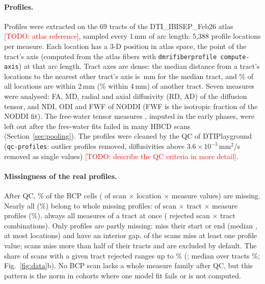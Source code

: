 \documentclass[11pt]{article}
\newcommand{\todo}[1]{\textcolor{red}{[TODO: #1]}}
\begin{document}
\paragraph{Profiles.} Profiles were extracted on the 69 tracts of the DTI\_IBISEP\_Feb26 atlas
\todo{atlas reference}, sampled every 1\,mm of arc length: 5,388 profile locations per measure. Each location has a
3-D position in atlas space, the point of the tract's axis (computed from the atlas fibers with
\texttt{dmrifiberprofile compute-axis}) at that arc length. Tract axes are dense: the median distance from a tract's
locations to the nearest other tract's axis is \axisTractMedian{}\,mm for the median tract, and \axisWithinTwo\% of all
locations are within 2\,mm (\axisWithinFour\% within 4\,mm) of another tract. Seven measures were analysed: FA, MD,
radial and axial diffusivity (RD, AD) of the diffusion tensor, and NDI, ODI and FWF of NODDI \citep{zhang2012noddi}
(FWF is the isotropic fraction of the NODDI fit). The free-water tensor measures
\citep{pasternak2009freewater}, imputed in the early phases, were left out after the free-water fits failed in many
HBCD scans (Section~\ref{sec:pooling}). The profiles were cleaned by the QC of DTIPlayground (\texttt{qc-profiles}:
outlier profiles removed, diffusivities above $3.6\times10^{-3}$\,mm$^2$/s removed as single values)
\todo{describe the QC criteria in more detail}.

\paragraph{Missingness of the real profiles.} After QC, \missCellShare\% of the BCP cells (\missCells{} of
\allCells{} scan $\times$ location $\times$ measure values) are missing. Nearly all
(\missWholeCellShare\%) belong to whole missing profiles: \missWholeN{} of \missProfilesN{} scan $\times$ tract
$\times$ measure profiles (\missWholeShare\%), always all measures of a tract at once (\missRejectedTracts{} rejected
scan $\times$ tract combinations). Only \missPartialN{} profiles are partly missing: \missPartialEnds{} miss their start
or end (median \missEndLenMedian{}, at most \missEndLenMax{} locations) and \missPartialInner{} have an interior gap.
\missScansAny{} of the \bcpscans{} scans miss at least one profile value; \missScansHalf{} scans miss more than half of
their tracts and are excluded by default. The share of scans with a given tract rejected ranges up to
\missTractMax\% (\missTractMaxName; median over tracts \missTractMedian\%; Fig.~\ref{fig:data}b). No BCP scan lacks
a whole measure family after QC, but this pattern is the norm in cohorts where one model fit fails or is not computed.
\end{document}
